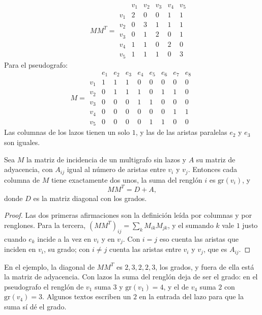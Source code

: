 \documentclass[11pt,letterpaper]{article}
\begin{document}
\begin{ejemplo}[Diapositivas 41 y 44]
\[    \qquad
    M M^{T} = \begin{array}{c|ccccc}
        & v_1 & v_2 & v_3 & v_4 & v_5 \\ \hline
      v_1 & 2 & 0 & 0 & 1 & 1 \\
      v_2 & 0 & 3 & 1 & 1 & 1 \\
      v_3 & 0 & 1 & 2 & 0 & 1 \\
      v_4 & 1 & 1 & 0 & 2 & 0 \\
      v_5 & 1 & 1 & 1 & 0 & 3
    \end{array}
  \]
  Para el pseudografo:
  \[
    M = \begin{array}{c|cccccccc}
        & e_1 & e_2 & e_3 & e_4 & e_5 & e_6 & e_7 & e_8 \\ \hline
      v_1 & 1 & 1 & 1 & 0 & 0 & 0 & 0 & 0 \\
      v_2 & 0 & 1 & 1 & 1 & 0 & 1 & 1 & 0 \\
      v_3 & 0 & 0 & 0 & 1 & 1 & 0 & 0 & 0 \\
      v_4 & 0 & 0 & 0 & 0 & 0 & 0 & 1 & 1 \\
      v_5 & 0 & 0 & 0 & 0 & 1 & 1 & 0 & 0
    \end{array}
  \]
  Las columnas de los lazos tienen un solo $1$, y las de las aristas
  paralelas $e_2$ y $e_3$ son iguales.
\end{ejemplo}

\begin{proposicion}
  \label{prop:incidencia}
  Sea $M$ la matriz de incidencia de un multigrafo sin lazos y $A$ su
  matriz de adyacencia, con $A_{ij}$ igual al número de aristas entre
  $v_i$ y $v_j$. Entonces cada columna de $M$ tiene exactamente dos
  unos, la suma del renglón $i$ es $\text{gr}(v_i)$, y
  \[
    M M^{T} = D + A ,
  \]
  donde $D$ es la matriz diagonal con los grados.
\end{proposicion}

\begin{proof}
  Las dos primeras afirmaciones son la definición leída por columnas y
  por renglones. Para la tercera,
  $(M M^{T})_{ij} = \sum_{k} M_{ik} M_{jk}$, y el sumando $k$ vale $1$
  justo cuando $e_k$ incide a la vez en $v_i$ y en $v_j$. Con
  $i = j$ eso cuenta las aristas que inciden en $v_i$, su grado; con
  $i \neq j$ cuenta las aristas entre $v_i$ y $v_j$, que es $A_{ij}$.
\end{proof}

En el ejemplo, la diagonal de $M M^{T}$ es $2, 3, 2, 2, 3$, los grados,
y fuera de ella está la matriz de adyacencia. Con lazos la suma del
renglón deja de ser el grado: en el pseudografo el renglón de $v_1$
suma $3$ y $\text{gr}(v_1) = 4$, y el de $v_4$ suma $2$ con
$\text{gr}(v_4) = 3$. Algunos textos escriben un $2$ en la entrada del
lazo para que la suma sí dé el grado.
\end{document}
